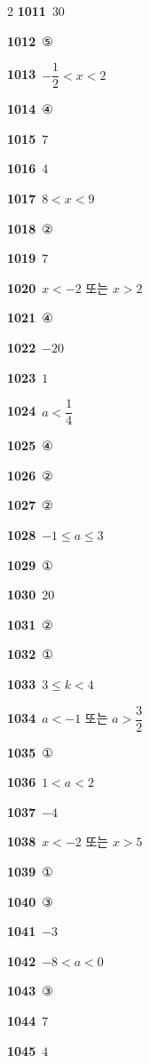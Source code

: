 \documentclass[10pt,a4paper]{article}
\begin{document}
\begin{multicols}{2}
\noindent\textbf{1011}\ $30$\par
\noindent\textbf{1012}\ ⑤\par
\noindent\textbf{1013}\ $-\dfrac{1}{2}<x<2$\par
\noindent\textbf{1014}\ ④\par
\noindent\textbf{1015}\ $7$\par
\noindent\textbf{1016}\ $4$\par
\noindent\textbf{1017}\ $8<x<9$\par
\noindent\textbf{1018}\ ②\par
\noindent\textbf{1019}\ $7$\par
\noindent\textbf{1020}\ $x<-2$ 또는 $x>2$\par
\noindent\textbf{1021}\ ④\par
\noindent\textbf{1022}\ $-20$\par
\noindent\textbf{1023}\ $1$\par
\noindent\textbf{1024}\ $a<\dfrac{1}{4}$\par
\noindent\textbf{1025}\ ④\par
\noindent\textbf{1026}\ ②\par
\noindent\textbf{1027}\ ②\par
\noindent\textbf{1028}\ $-1\le a\le 3$\par
\noindent\textbf{1029}\ ①\par
\noindent\textbf{1030}\ $20$\par
\noindent\textbf{1031}\ ②\par
\noindent\textbf{1032}\ ①\par
\noindent\textbf{1033}\ $3\le k<4$\par
\noindent\textbf{1034}\ $a<-1$ 또는 $a>\dfrac{3}{2}$\par
\noindent\textbf{1035}\ ①\par
\noindent\textbf{1036}\ $1<a<2$\par
\noindent\textbf{1037}\ $-4$\par
\noindent\textbf{1038}\ $x<-2$ 또는 $x>5$\par
\noindent\textbf{1039}\ ①\par
\noindent\textbf{1040}\ ③\par
\noindent\textbf{1041}\ $-3$\par
\noindent\textbf{1042}\ $-8<a<0$\par
\noindent\textbf{1043}\ ③\par
\noindent\textbf{1044}\ $7$\par
\noindent\textbf{1045}\ $4$\par

\end{multicols}
\end{document}
